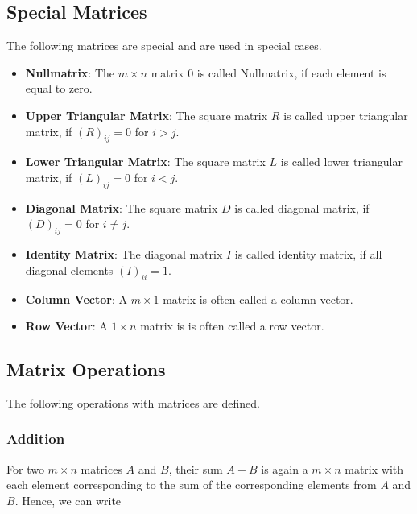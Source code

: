 \documentclass[
]{book}
\providecommand{\tightlist}{%
  \setlength{\itemsep}{0pt}\setlength{\parskip}{0pt}}
\theoremstyle{definition}
\theoremstyle{definition}
\theoremstyle{definition}
\theoremstyle{remark}
\begin{document}
\hypertarget{intro-linalg-special-matrices}{%
\subsection{Special Matrices}\label{intro-linalg-special-matrices}}

The following matrices are special and are used in special cases.

\begin{itemize}
\tightlist
\item
  \textbf{Nullmatrix}: The \(m\times n\) matrix \(0\) is called Nullmatrix, if each element is equal to zero.
\item
  \textbf{Upper Triangular Matrix}: The square matrix \(R\) is called upper triangular matrix, if \((R)_{ij} = 0\) for \(i>j\).
\item
  \textbf{Lower Triangular Matrix}: The square matrix \(L\) is called lower triangular matrix, if \((L)_{ij} = 0\) for \(i<j\).
\item
  \textbf{Diagonal Matrix}: The square matrix \(D\) is called diagonal matrix, if \((D)_{ij} = 0\) for \(i\ne j\).
\item
  \textbf{Identity Matrix}: The diagonal matrix \(I\) is called identity matrix, if all diagonal elements \((I)_{ii} = 1\).
\item
  \textbf{Column Vector}: A \(m\times 1\) matrix is often called a column vector.
\item
  \textbf{Row Vector}: A \(1\times n\) matrix is is often called a row vector.
\end{itemize}

\hypertarget{intro-linalg-matrix-operation}{%
\subsection{Matrix Operations}\label{intro-linalg-matrix-operation}}

The following operations with matrices are defined.

\hypertarget{intro-linalg-matrix-addition}{%
\subsubsection{Addition}\label{intro-linalg-matrix-addition}}

For two \(m\times n\) matrices \(A\) and \(B\), their sum \(A+B\) is again a \(m\times n\) matrix with each element corresponding to the sum of the corresponding elements from \(A\) and \(B\). Hence, we can write
\end{document}
